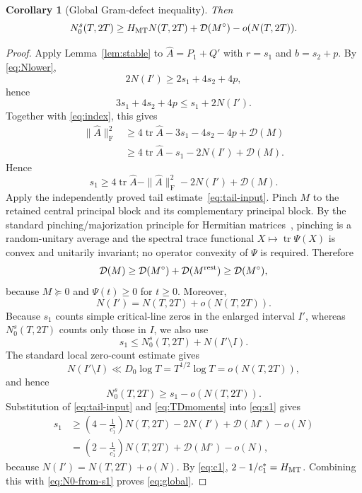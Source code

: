 \documentclass[11pt]{article}
\newtheorem{corollary}[theorem]{Corollary}
\DeclareMathOperator{\tr}{tr}
\newcommand{\Frob}{\mathrm F}
\newcommand{\cD}{\mathcal D}
\begin{document}
\begin{corollary}[Global Gram-defect inequality]\label{cor:global}
Then
\begin{equation}\label{eq:global}
 N_0^s(T,2T)
 \ge H_{\rm MT}N(T,2T)+\cD(M^\circ)-o(N(T,2T)).
\end{equation}
\end{corollary}

\begin{proof}
Apply Lemma~\ref{lem:stable} to $\widehat A=P_1+Q'$ with $r=s_1$ and
$b=s_2+p$.  By \eqref{eq:Nlower},
\[
 2N(I')\ge2s_1+4s_2+4p,
\]
hence
\[
 3s_1+4s_2+4p\le s_1+2N(I').
\]
Together with \eqref{eq:index}, this gives
\begin{align*}
 \|\widehat A\|_{\Frob}^2
 &\ge4\tr\widehat A-3s_1-4s_2-4p+\cD(M)\\
 &\ge4\tr\widehat A-s_1-2N(I')+\cD(M).
\end{align*}
Hence
\begin{equation}\label{eq:s1}
 s_1\ge4\tr\widehat A-\|\widehat A\|_{\Frob}^2-2N(I')+\cD(M).
\end{equation}
Apply the independently proved tail estimate~\eqref{eq:tail-input}.  Pinch
$M$ to the retained central principal block and its complementary principal
block.  By the standard pinching/majorization principle for Hermitian
matrices~\cite{Bhatia97}, pinching is a random-unitary average and the
spectral trace functional $X\mapsto\tr\Psi(X)$ is convex and unitarily
invariant; no operator convexity of $\Psi$ is required.  Therefore
\[
 \cD(M)
 \ge
 \cD(M^\circ)+\cD(M^{\rm rest})
 \ge
 \cD(M^\circ),
\]
because $M\succeq0$ and $\Psi(t)\ge0$ for $t\ge0$.  Moreover,
\[
 N(I')=N(T,2T)+o(N(T,2T)).
\]
Because $s_1$ counts simple critical-line zeros in the enlarged interval
$I'$, whereas $N_0^s(T,2T)$ counts only those in $I$, we also use
\begin{equation}\label{eq:s1-central}
 s_1\le N_0^s(T,2T)+N(I'\setminus I).
\end{equation}
The standard local zero-count estimate gives
\[
 N(I'\setminus I)\ll D_0\log T=T^{1/2}\log T=o(N(T,2T)),
\]
and hence
\begin{equation}\label{eq:N0-from-s1}
 N_0^s(T,2T)\ge s_1-o(N(T,2T)).
\end{equation}
Substitution of \eqref{eq:tail-input} and \eqref{eq:TDmoments} into
\eqref{eq:s1} gives
\begin{align*}
 s_1
 &\ge
 \left(4-\frac1{c_1^*}\right)N(T,2T)
 -2N(I')+\cD(M^\circ)-o(N)\\
 &=
 \left(2-\frac1{c_1^*}\right)N(T,2T)
 +\cD(M^\circ)-o(N),
\end{align*}
because $N(I')=N(T,2T)+o(N)$.  By \eqref{eq:c1},
$2-1/c_1^*=H_{\rm MT}$.  Combining this with
\eqref{eq:N0-from-s1} proves \eqref{eq:global}.
\end{proof}
\end{document}
